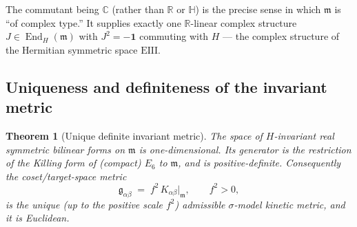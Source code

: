 \documentclass[11pt]{article}
\theoremstyle{plain}
\newtheorem{theorem}{Theorem}[section]
\theoremstyle{definition}
\theoremstyle{remark}
\newcommand{\End}{\operatorname{End}}
\begin{document}
The commutant being $\mathbb C$ (rather than $\mathbb R$ or
$\mathbb H$) is the precise sense in which $\mathfrak m$ is ``of complex
type.'' It supplies exactly one $\mathbb R$-linear complex structure
$J\in\End_H(\mathfrak m)$ with $J^2=-\mathbf 1$ commuting with $H$ --- the
complex structure of the Hermitian symmetric space $\mathrm{EIII}$.

\subsection{Uniqueness and definiteness of the invariant metric}
\label{sec:app-spectrum:metric}

\begin{theorem}[Unique definite invariant metric]
\label{thm:app-spectrum:metric}
The space of $H$-invariant real symmetric bilinear forms on
$\mathfrak m$ is \emph{one-dimensional}. Its generator is the restriction
of the Killing form of (compact) $E_6$ to $\mathfrak m$, and is
\emph{positive-definite}. Consequently the coset/target-space metric
\begin{equation}
  \mathfrak g_{\alpha\beta} \;=\; f^2\,K_{\alpha\beta}\big|_{\mathfrak m},
  \qquad f^2>0,
  \label{eq:app-spectrum:metric}
\end{equation}
is the unique (up to the positive scale $f^2$) admissible
$\sigma$-model kinetic metric, and it is Euclidean.
\end{theorem}
\end{document}
